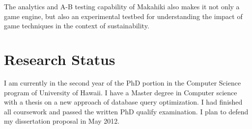 \documentclass{acm_proc_article-sp}
\begin{document}
The analytics and A-B testing capability of Makahiki also makes it not only a game engine, but also an experimental testbed for understanding the impact of game techniques in the context of sustainability.

\section{Research Status}


%

I am currently in the second year of the PhD portion in the Computer Science program of University of Hawaii. I have a Master degree in Computer science with a thesis on a new approach of database query optimization. I had finished all coursework and passed the written PhD qualify examination.  I plan to defend my dissertation proposal in May 2012.
\end{document}
